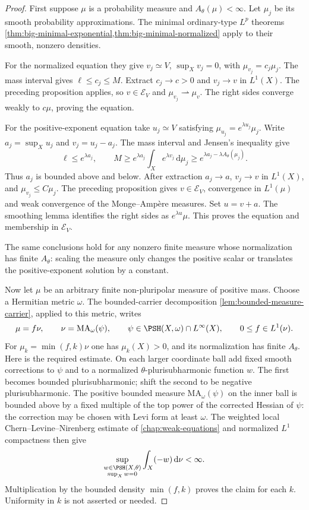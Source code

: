 \begin{proof}
First suppose $\mu$ is a probability measure and $A_\theta(\mu)<\infty$. Let $\mu_j$ be its smooth probability approximations. The minimal ordinary-type $L^p$ theorems \cref{thm:big-minimal-exponential,thm:big-minimal-normalized} apply to their smooth, nonzero densities.

For the normalized equation they give $v_j\simeq V$, $\sup_Xv_j=0$, with $\mu_{v_j}=c_j\mu_j$. The mass interval gives $\ell\leq c_j\leq M$. Extract $c_j\to c>0$ and $v_j\to v$ in $L^1(X)$. The preceding proposition applies, so $v\in\mathcal E_V$ and $\mu_{v_j}\rightharpoonup\mu_v$. The right sides converge weakly to $c\mu$, proving the equation.

For the positive-exponent equation take $u_j\simeq V$ satisfying $\mu_{u_j}=e^{\lambda u_j}\mu_j$. Write $a_j=\sup_Xu_j$ and $v_j=u_j-a_j$. The mass interval and Jensen's inequality give
\[
 \ell\leq e^{\lambda a_j},\qquad
 M\geq e^{\lambda a_j}\int_Xe^{\lambda v_j}\,\mathrm{d}\mu_j
       \geq e^{\lambda a_j-\lambda A_\theta(\mu_j)}.
\]
Thus $a_j$ is bounded above and below. After extraction $a_j\to a$, $v_j\to v$ in $L^1(X)$, and $\mu_{v_j}\leq C\mu_j$. The preceding proposition gives $v\in\mathcal E_V$, convergence in $L^1(\mu)$ and weak convergence of the Monge--Amp\`ere measures. Set $u=v+a$. The smoothing lemma identifies the right sides as $e^{\lambda u}\mu$. This proves the equation and membership in $\mathcal E_V$.

The same conclusions hold for any nonzero finite measure whose normalization has finite $A_\theta$: scaling the measure only changes the positive scalar or translates the positive-exponent solution by a constant.

Now let $\mu$ be an arbitrary finite non-pluripolar measure of positive mass. Choose a Hermitian metric $\omega$. The bounded-carrier decomposition \cref{lem:bounded-measure-carrier}, applied to this metric, writes
\[
 \mu=f\nu,\qquad \nu=\mathrm{MA}_\omega(\psi),\qquad
 \psi\in\PSH(X,\omega)\cap L^\infty(X),\qquad
 0\leq f\in L^1(\nu).
\]
For $\mu_k=\min(f,k)\nu$ one has $\mu_k(X)>0$, and its normalization has finite $A_\theta$. Here is the required estimate. On each larger coordinate ball add fixed smooth corrections to $\psi$ and to a normalized $\theta$-plurisubharmonic function $w$. The first becomes bounded plurisubharmonic; shift the second to be negative plurisubharmonic. The positive bounded measure $\mathrm{MA}_\omega(\psi)$ on the inner ball is bounded above by a fixed multiple of the top power of the corrected Hessian of $\psi$: the correction may be chosen with Levi form at least $\omega$. The weighted local Chern--Levine--Nirenberg estimate of \cref{chap:weak-equations} and normalized $L^1$ compactness then give
\[
 \sup_{\substack{w\in\PSH(X,\theta)\\\sup_Xw=0}}
       \int_X(-w)\,\mathrm{d}\nu<\infty.
\]
Multiplication by the bounded density $\min(f,k)$ proves the claim for each $k$. Uniformity in $k$ is not asserted or needed.


\end{proof}
